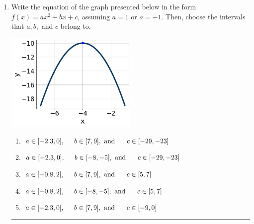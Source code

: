 \documentclass[14pt]{extbook}
\newcommand{\litem}[1]{\item#1\hspace*{-1cm}\rule{\textwidth}{0.4pt}}
\begin{document}
\begin{enumerate}
{\begin{enumerate}[label=\Alph*.]
\end{enumerate} }
\litem{
Write the equation of the graph presented below in the form $f(x)=ax^2+bx+c$, assuming  $a=1$ or $a=-1$. Then, choose the intervals that $a, b,$ and $c$ belong to.
\begin{center}
    \includegraphics[width=0.5\textwidth]{../Figures/quadraticGraphToEquationCopyC.png}
\end{center}
\begin{enumerate}[label=\Alph*.]
\item \( a \in [-2.3, 0], \hspace*{5mm} b \in [7, 9], \text{ and } \hspace*{5mm} c \in [-29, -23] \)
\item \( a \in [-2.3, 0], \hspace*{5mm} b \in [-8, -5], \text{ and } \hspace*{5mm} c \in [-29, -23] \)
\item \( a \in [-0.8, 2], \hspace*{5mm} b \in [7, 9], \text{ and } \hspace*{5mm} c \in [5, 7] \)
\item \( a \in [-0.8, 2], \hspace*{5mm} b \in [-8, -5], \text{ and } \hspace*{5mm} c \in [5, 7] \)
\item \( a \in [-2.3, 0], \hspace*{5mm} b \in [7, 9], \text{ and } \hspace*{5mm} c \in [-9, 0] \)


\end{enumerate}}
\end{enumerate}
\end{document}
